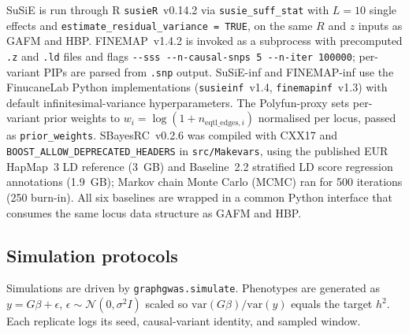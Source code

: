 SuSiE\cite{wang2020simple,zou2022fine} is run through R
\texttt{susieR}~v0.14.2 via \texttt{susie\_suff\_stat} with
$L{=}10$ single effects and
\texttt{estimate\_residual\_variance\,=\,TRUE}, on the same $R$ and
$z$ inputs as GAFM and HBP.
FINEMAP\cite{benner2016finemap}~v1.4.2 is invoked as a subprocess
with precomputed \texttt{.z} and \texttt{.ld} files and flags
\texttt{-{-}sss -{-}n-causal-snps 5 -{-}n-iter 100000}; per-variant
PIPs are parsed from \texttt{.snp} output. SuSiE-inf and FINEMAP-inf
use the FinucaneLab Python implementations
(\texttt{susieinf}~v1.4, \texttt{finemapinf}~v1.3)\cite{cui2024improving}
with default infinitesimal-variance hyperparameters. The
Polyfun-proxy\cite{weissbrod2020polyfun} sets per-variant prior
weights to $w_i = \log(1 + n_{\text{eqtl\_edges},i})$ normalised per
locus, passed as \texttt{prior\_weights}.
SBayesRC\cite{zheng2024leveraging}~v0.2.6 was compiled with
CXX17 and \texttt{BOOST\_ALLOW\_DEPRECATED\_HEADERS} in
\texttt{src/Makevars}, using the published EUR HapMap~3 LD
reference (3~GB) and Baseline~2.2 stratified LD score regression
annotations (1.9~GB)\cite{finucane2015partitioning,buliksullivan2015ld};
Markov chain Monte Carlo (MCMC) ran for 500 iterations
(250 burn-in). All six baselines are wrapped in a
common Python interface that consumes the same locus data structure
as GAFM and HBP.

\subsection*{Simulation protocols}

Simulations are driven by \texttt{graphgwas.simulate}. Phenotypes
are generated as $y = G\beta + \epsilon$, $\epsilon \sim
\mathcal{N}(0, \sigma^2 I)$ scaled so $\text{var}(G\beta)/\text{var}(y)$
equals the target $h^2$. Each replicate logs its seed, causal-variant
identity, and sampled window.

